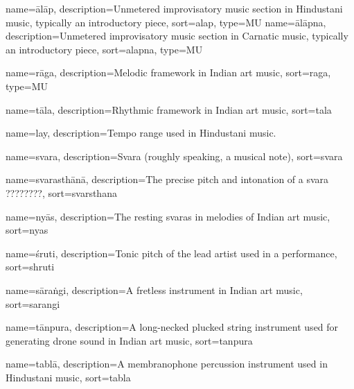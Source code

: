 




{
	name={\={a}l\={a}p},
	description={Unmetered improvisatory music section in Hindustani music, typically an introductory piece},
	sort=alap,
	type=MU
}
{
	name={\={a}l\={a}pna},
	description={Unmetered improvisatory music section in Carnatic music, typically an introductory piece},
	sort=alapna,
	type=MU	
}

{
  name={r\={a}ga},
  description={Melodic framework in Indian art music},
  sort=raga,
	type=MU  
}


{
	name={t\={a}la},
	description={Rhythmic framework in Indian art music},
	sort=tala
}

{
	name={lay},
	description={Tempo range used in Hindustani music.}
}

{
	name={svara},
	description={Svara (roughly speaking, a musical note)},
	sort=svara
}


{
	name={svarasth\={a}n\={a}},
	description={The precise pitch and intonation of a svara ????????},
	sort=svarsthana
}

{
	name={ny\={a}s},
	description={The resting svaras in melodies of Indian art music},
	sort=nyas
}

{
	name={\'sruti},
	description={Tonic pitch of the lead artist used in a performance},
	sort=shruti
}

{
	name={s\={a}ra\.{n}gi},
	description={A fretless instrument in Indian art music},
	sort=sarangi
}

{
	name={t\={a}npura},
	description={A long-necked plucked string instrument used for generating drone sound in Indian art music},
	sort=tanpura
}

{
	name={tabl\={a}},
	description={A membranophone percussion instrument used in Hindustani music},
	sort=tabla
}

